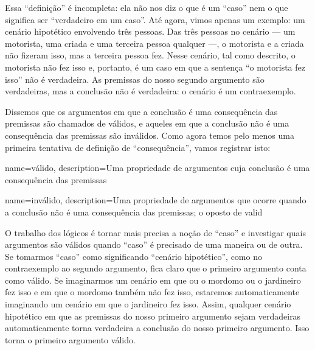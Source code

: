 Essa \textquotedblleft definição\textquotedblright{} é incompleta: ela não nos diz o que é um \textquotedblleft caso\textquotedblright{} nem o que significa ser \textquotedblleft verdadeiro em um caso\textquotedblright{}. Até agora, vimos apenas um exemplo: um cenário hipotético envolvendo três pessoas. Das três pessoas no cenário — um motorista, uma criada e uma terceira pessoa qualquer —, o motorista e a criada não fizeram isso, mas a terceira pessoa fez. Nesse cenário, tal como descrito, o motorista não fez isso e, portanto, é um caso em que a sentença \textquotedblleft o motorista fez isso\textquotedblright{} não é verdadeira. As premissas do nosso segundo argumento são verdadeiras, mas a conclusão não é verdadeira: o cenário é um contraexemplo.

Dissemos que os argumentos em que a conclusão é uma consequência das premissas são chamados de válidos, e aqueles em que a conclusão não é uma consequência das premissas são inválidos. Como agora temos pelo menos uma primeira tentativa de definição de \textquotedblleft consequência\textquotedblright{}, vamos registrar isto:


{
name=válido,
description={Uma propriedade de argumentos cuja conclusão é uma consequência das premissas}
}

{
name=inválido,
description={Uma propriedade de argumentos que ocorre quando a conclusão não é uma consequência das premissas; o oposto de \gls{valid}}
}

O trabalho dos lógicos é tornar mais precisa a noção de \textquotedblleft caso\textquotedblright{} e investigar quais argumentos são válidos quando \textquotedblleft caso\textquotedblright{} é precisado de uma maneira ou de outra. Se tomarmos \textquotedblleft caso\textquotedblright{} como significando \textquotedblleft cenário hipotético\textquotedblright{}, como no contraexemplo ao segundo argumento, fica claro que o primeiro argumento conta como válido. Se imaginarmos um cenário em que ou o mordomo ou o jardineiro fez isso e em que o mordomo também não fez isso, estaremos automaticamente imaginando um cenário em que o jardineiro fez isso. Assim, qualquer cenário hipotético em que as premissas do nosso primeiro argumento sejam verdadeiras automaticamente torna verdadeira a conclusão do nosso primeiro argumento. Isso torna o primeiro argumento válido.

